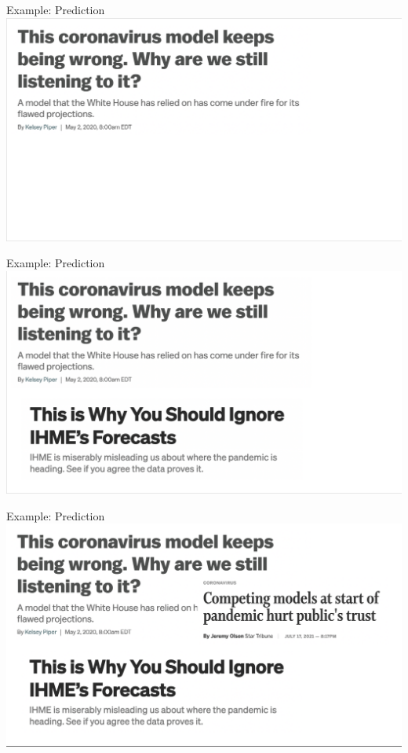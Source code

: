 \documentclass[10pt,t]{beamer}
\begin{document}
\begin{frame}[c]{Example: Prediction}
\centering \includegraphics[scale=0.35]{ihme1.png}
\end{frame}

\begin{frame}[c]{Example: Prediction}
\centering \includegraphics[scale=0.35]{ihme2.png}
\end{frame}

\begin{frame}[c]{Example: Prediction}
\centering \includegraphics[scale=0.35]{ihme3.png}
\end{frame}
\end{document}
